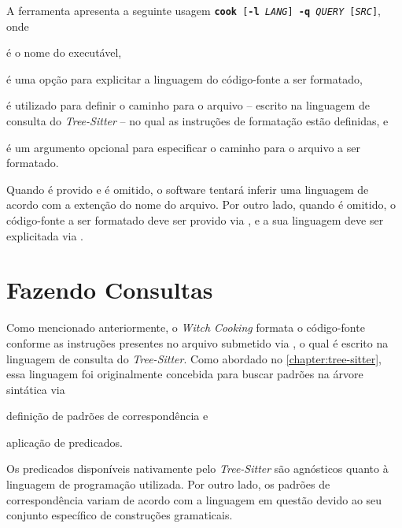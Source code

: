 \documentclass
  [11pt,a4paper,english,brazil,openright,sumario=tradicional,twoside]
  {abntex2}
\newcommand{\treesitter}{\textit{Tree-Sitter}\xspace}
\newcommand{\witchcooking}{\textit{Witch Cooking}\xspace}
\begin{document}
  A ferramenta apresenta a seguinte usagem
  \boxed
    {\texttt{\textbf{cook}
     [\textbf{-l} \textit{LANG}]
     \textbf{-q} \textit{QUERY}
     [\textit{SRC}]}},
  onde
  \begin{inparaenum}
    \item {} é o nome do executável,
    \item {} é uma opção para
          explicitar a linguagem do código-fonte a ser formatado,
    \item {} é utilizado para
          definir o caminho para o arquivo -- escrito na linguagem de consulta
          do \treesitter{} -- no qual as instruções de formatação estão
          definidas, e
    \item {} é um argumento opcional para
          especificar o caminho para o arquivo a ser formatado.
  \end{inparaenum}
  Quando  é provido e
   é omitido, o software tentará
  inferir uma linguagem de acordo com a extenção do nome do arquivo. Por outro
  lado, quando  é omitido, o código-fonte a ser
  formatado deve ser provido via \textit{}, e a sua linguagem
  deve ser explicitada via .

  \section{Fazendo Consultas}

  Como mencionado anteriormente, o \witchcooking formata o código-fonte
  conforme as instruções presentes no arquivo submetido via
  , o qual é escrito na linguagem de
  consulta do \treesitter. Como abordado no \autoref{chapter:tree-sitter}, essa
  linguagem foi originalmente concebida para buscar padrões na árvore sintática
  via
  \begin{inparaenum}
    \item definição de padrões de correspondência e
    \item aplicação de predicados.
  \end{inparaenum}
  Os predicados disponíveis nativamente pelo \treesitter são agnósticos
  quanto à linguagem de programação utilizada. Por outro lado, os padrões de
  correspondência variam de acordo com a linguagem em questão devido ao seu
  conjunto específico de construções gramaticais.
\end{document}
